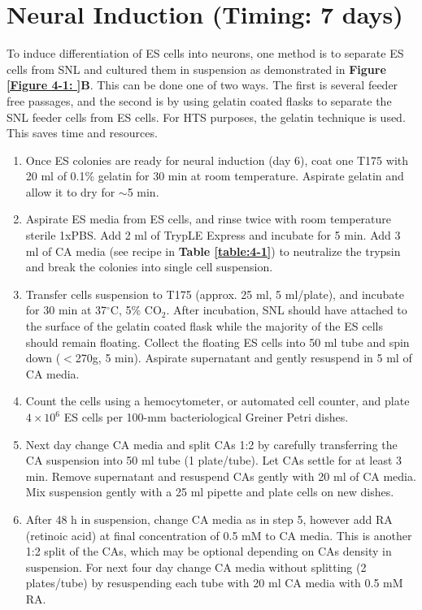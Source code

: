 \section{Neural Induction (Timing: 7 days)}

To induce differentiation of ES cells into neurons, one method is to separate ES cells from SNL and cultured them in suspension as demonstrated in \textbf{Figure \ref{Figure 4-1: }B}. This can be done one of two ways. The first is several feeder free passages, and the second is by using gelatin coated flasks to separate the SNL feeder cells from ES cells. For HTS purposes, the gelatin technique is used. This saves time and resources.

\begin{enumerate}
\item Once ES colonies are ready for neural induction (day 6), coat one T175 with 20 ml of 0.1\% gelatin for 30 min at room temperature. Aspirate gelatin and allow it to dry for $\sim$5 min.
\item Aspirate ES media from ES cells, and rinse twice with room temperature sterile 1xPBS. Add 2 ml of TrypLE Express and incubate for 5 min. Add 3 ml of CA media (see recipe in \textbf{Table \ref{table:4-1}}) to neutralize the trypsin and break the colonies into single cell suspension.
\item Transfer cells suspension to T175 (approx. 25 ml, 5 ml/plate), and incubate for 30 min at 37$^{\circ}$C, 5\% CO\(_2\). After incubation, SNL should have attached to the surface of the gelatin coated flask while the majority of the ES cells should remain floating. Collect the floating ES cells into 50 ml tube and spin down (\( < \)270g, 5 min). Aspirate supernatant and gently resuspend in 5 ml of CA media.
\item Count the cells using a hemocytometer, or automated cell counter, and plate \(4 \times 10^6\) ES cells per 100-mm bacteriological Greiner Petri dishes.
\item Next day change CA media and split CAs 1:2 by carefully transferring the CA suspension into 50 ml tube (1 plate/tube)\footnotemark. Let CAs settle for at least 3 min. Remove supernatant and resuspend CAs gently with 20 ml of CA media. Mix suspension gently with a 25 ml pipette and plate cells on new dishes. 
\item After 48 h in suspension, change CA media as in step 5, however add RA (retinoic acid) at final concentration of 0.5 mM to CA media. This is another 1:2 split of the CAs, which may be optional depending on CAs density in suspension.  For next four day change CA media without splitting (2 plates/tube) by resuspending each tube with 20 ml CA media with 0.5 mM RA.
\end{enumerate}

